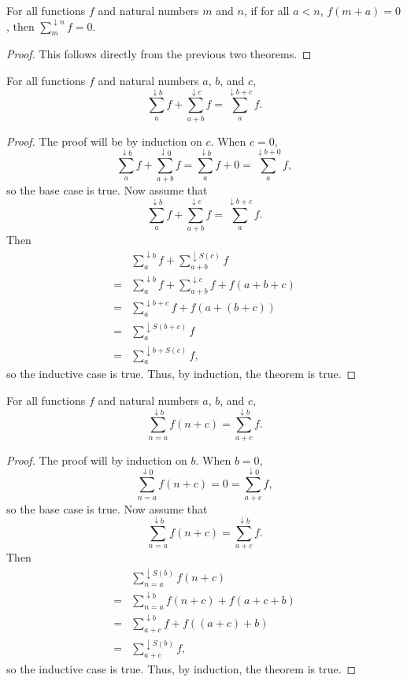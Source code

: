 \documentclass[../../math.tex]{subfiles}
\begin{document}
\begin{theorem}
    For all functions $f$ and natural numbers $m$ and $n$, if for all $a < n$,
    $f(m + a) = 0$, then $\sum_m^{\downarrow n} f = 0$.
\end{theorem}
\begin{proof}
    This follows directly from the previous two theorems.
\end{proof}

\begin{theorem}
    For all functions $f$ and natural numbers $a$, $b$, and $c$,
    \[
        \sum_a^{\downarrow b} f + \sum_{a + b}^{\downarrow c} f =
        \sum_a^{\downarrow b + c} f.
    \]
\end{theorem}
\begin{proof}
    The proof will be by induction on $c$.  When $c = 0$,
    \[
        \sum_a^{\downarrow b} f + \sum_{a + b}^{\downarrow 0} f =
        \sum_a^{\downarrow b} f + 0 =
        \sum_a^{\downarrow b + 0} f,
    \]
    so the base case is true.  Now assume that
    \[
        \sum_a^{\downarrow b} f + \sum_{a + b}^{\downarrow c} f =
        \sum_a^{\downarrow b + c} f.
    \]
    Then
    \begin{align*}
           & \sum_a^{\downarrow b} f + \sum_{a + b}^{\downarrow S(c)} f \\
        ={}& \sum_a^{\downarrow b} f + \sum_{a + b}^{\downarrow c} f
            + f(a + b + c) \\
        ={}& \sum_a^{\downarrow b + c} f + f(a + (b + c)) \\
        ={}& \sum_a^{\downarrow S(b + c)} f \\
        ={}& \sum_a^{\downarrow b + S(c)} f,
    \end{align*}
    so the inductive case is true.  Thus, by induction, the theorem is true.
\end{proof}

\begin{theorem}
    For all functions $f$ and natural numbers $a$, $b$, and $c$,
    \[
        \sum_{n = a}^{\downarrow b} f(n + c) = \sum_{a + c}^{\downarrow b} f.
    \]
\end{theorem}
\begin{proof}
    The proof will by induction on $b$.  When $b = 0$,
    \[
        \sum_{n = a}^{\downarrow 0} f(n + c) = 0 =
        \sum_{a + c}^{\downarrow 0} f,
    \]
    so the base case is true.  Now assume that
    \[
        \sum_{n = a}^{\downarrow b} f(n + c) = \sum_{a + c}^{\downarrow b} f.
    \]
    Then
    \begin{align*}
           & \sum_{n = a}^{\downarrow S(b)} f(n + c) \\
        ={}& \sum_{n = a}^{\downarrow b} f(n + c) + f (a + c + b) \\
        ={}& \sum_{a + c}^{\downarrow b} f + f((a + c) + b) \\
        ={}& \sum_{a + c}^{\downarrow S(b)} f,
    \end{align*}
    so the inductive case is true.  Thus, by induction, the theorem is true.
\end{proof}
\end{document}
